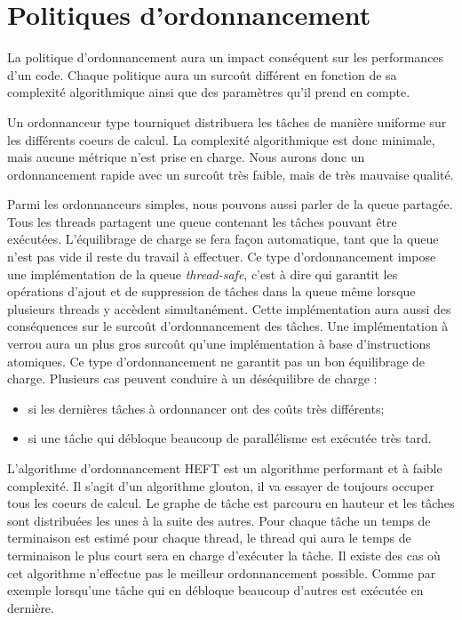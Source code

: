 \section{Politiques d'ordonnancement}
La politique d'ordonnancement aura un impact conséquent sur les performances d'un code.
%
Chaque politique aura un surcoût différent en fonction de sa complexité algorithmique ainsi que des paramètres qu'il prend en compte.

Un ordonnanceur type tourniquet distribuera les tâches de manière uniforme sur les différents coeurs de calcul.
%
La complexité algorithmique est donc minimale, mais aucune métrique n'est prise en charge.
%
Nous aurons donc un ordonnancement rapide avec un surcoût très faible, mais de très mauvaise qualité.

Parmi les ordonnanceurs simples, nous pouvons aussi parler de la queue partagée.
%
Tous les threads partagent une queue contenant les tâches pouvant être exécutées.
%
L'équilibrage de charge se fera façon automatique, tant que la queue n'est pas vide il reste du travail à effectuer.
%
Ce type d'ordonnancement impose une implémentation de la queue {\em thread-safe}, c'est à dire qui garantit les opérations d'ajout et de suppression de tâches dans la queue même lorsque plusieurs threads y accèdent simultanément.
%
Cette implémentation aura aussi des conséquences sur le surcoût d'ordonnancement des tâches.
%
Une implémentation à verrou aura un plus gros surcoût qu'une implémentation à base d'instructions atomiques.
%
Ce type d'ordonnancement ne garantit pas un bon équilibrage de charge.
%
Plusieurs cas peuvent conduire à un déséquilibre de charge :
\begin{itemize}
  \item si les dernières tâches à ordonnancer ont des coûts très différents;
  \item si une tâche qui débloque beaucoup de parallélisme est exécutée très tard.
\end{itemize}

L'algorithme d'ordonnancement HEFT est un algorithme performant et à faible complexité\cite{heft2}.
%
Il s'agit d'un algorithme glouton, il va essayer de toujours occuper tous les coeurs de calcul.
%
Le graphe de tâche est parcouru en hauteur et les tâches sont distribuées les unes à la suite des autres.
%
Pour chaque tâche un temps de terminaison est estimé pour chaque thread, le thread qui aura le temps de terminaison le plus court sera en charge d'exécuter la tâche.
%
Il existe des cas où cet algorithme n'effectue pas le meilleur ordonnancement possible.
%
Comme par exemple lorsqu'une tâche qui en débloque beaucoup d'autres est exécutée en dernière.
